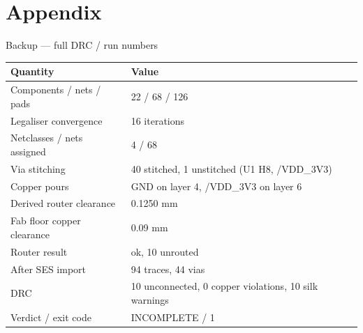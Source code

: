 \documentclass[aspectratio=169,10pt]{beamer}
\newcommand{\code}[1]{{\ttfamily\small #1}}
\begin{document}
\appendix
\section{Appendix}
\begin{frame}{Backup --- full DRC / run numbers}
\vspace{1mm}
\begin{center}\small
\begin{tabular}{@{}p{} p{}@{}}
\toprule
\textbf{Quantity} & \textbf{Value}\\
\midrule
Components / nets / pads & 22 / 68 / 126\\
Legaliser convergence & 16 iterations\\
Netclasses / nets assigned & 4 / 68\\
Via stitching & 40 stitched, 1 unstitched (\code{U1} \code{H8}, \code{/VDD\_3V3})\\
Copper pours & GND on layer 4, \code{/VDD\_3V3} on layer 6\\
Derived router clearance & 0.1250 mm\\
Fab floor copper clearance & 0.09 mm\\
Router result & ok, 10 unrouted\\
After SES import & 94 traces, 44 vias\\
DRC & 10 unconnected, 0 copper violations, 10 silk warnings\\
Verdict / exit code & \code{INCOMPLETE} / 1\\
\bottomrule
\end{tabular}
\end{center}
\end{frame}
\end{document}

